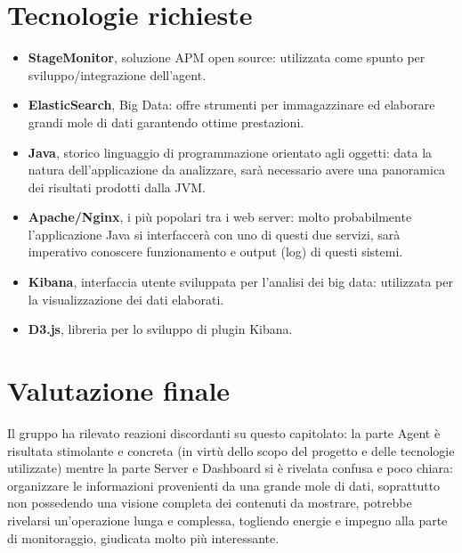 \documentclass[StudioDiFattibilità.tex]{subfiles}
\begin{document}
\section{Tecnologie richieste}
\begin{itemize}
	\item \textbf{StageMonitor}, soluzione APM open source: utilizzata come spunto per sviluppo/integrazione dell'agent.
	\item \textbf{ElasticSearch},  Big Data: offre strumenti per immagazzinare ed elaborare grandi mole di dati garantendo ottime prestazioni.
	\item \textbf{Java}, storico linguaggio di programmazione orientato agli oggetti: data la natura dell'applicazione da analizzare, sarà necessario avere una panoramica dei risultati prodotti dalla JVM.
	\item \textbf{Apache/Nginx}, i più popolari tra i web server: molto probabilmente l'applicazione Java si interfaccerà con uno di questi due servizi, sarà imperativo conoscere funzionamento e output (log) di questi sistemi. 
	\item \textbf{Kibana}, interfaccia utente sviluppata per l'analisi dei big data: utilizzata per la visualizzazione dei dati elaborati.
	\item \textbf{D3.js}, libreria  per lo sviluppo di plugin Kibana.
\end{itemize}
\section{Valutazione finale}
Il gruppo ha rilevato reazioni discordanti su questo capitolato: la parte Agent è risultata stimolante e concreta (in virtù dello scopo del progetto e delle tecnologie utilizzate) mentre la parte Server e Dashboard si è rivelata confusa e poco chiara: organizzare le informazioni provenienti da una grande mole di dati, soprattutto non possedendo una visione completa dei contenuti da mostrare, potrebbe rivelarsi un'operazione lunga e complessa, togliendo energie e impegno alla parte di monitoraggio, giudicata molto più interessante.  
\end{document}
